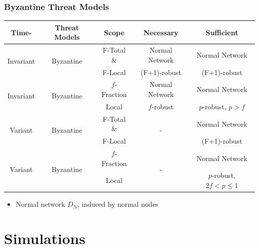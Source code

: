 \documentclass{beamer}
\begin{document}
\begin{frame}
\frametitle{Byzantine Threat Models}
\begin{table}
\centering
\begin{tabular}{|c|c|c|c|c|}
\hline \scriptsize{\textbf{Time-}} &\scriptsize{\textbf{Threat Models}} &  \scriptsize{\textbf{Scope}} & \scriptsize{\textbf{Necessary}} & \scriptsize{\textbf{Sufficient}} \\
\hline \multirow{2}{*}{\scriptsize{Invariant}} & \multirow{2}{*}{\scriptsize{Byzantine}} & \scriptsize{F-Total \&}  & \scriptsize{Normal Network} & \scriptsize{Normal Network} \\
& & \scriptsize{F-Local}  & \scriptsize{(F+1)-robust} & \scriptsize{(F+1)-robust}\\ 
\hline \multirow{2}{*}{\scriptsize{Invariant}} & \multirow{2}{*}{\scriptsize{Byzantine}} & \scriptsize{$f$-Fraction}  & \scriptsize{Normal Network} & \scriptsize{Normal Network} \\
& & \scriptsize{Local}  & \scriptsize{$f$-robust} & \scriptsize{$p$-robust, $p>f$}\\
\hline \multirow{2}{*}{\scriptsize{Variant}} & \multirow{2}{*}{\scriptsize{Byzantine}} & \scriptsize{F-Total \&}  & \multirow{2}{*}{-} & \scriptsize{Normal Network} \\
& & \scriptsize{F-Local}  &  & \scriptsize{(F+1)-robust}\\ 
\hline \multirow{2}{*}{\scriptsize{Variant}} & \multirow{2}{*}{\scriptsize{Byzantine}} & \scriptsize{$f$-Fraction}  & \multirow{2}{*}{-} & \scriptsize{Normal Network} \\
& & \scriptsize{Local}  &  & \scriptsize{$p$-robust, $2f< p\leq 1$}\\
\hline
\end{tabular}
\end{table}
\begin{itemize}
\item Normal network $D_N$, induced by normal nodes
\end{itemize}
\end{frame}

\section{Simulations}
\end{document}
